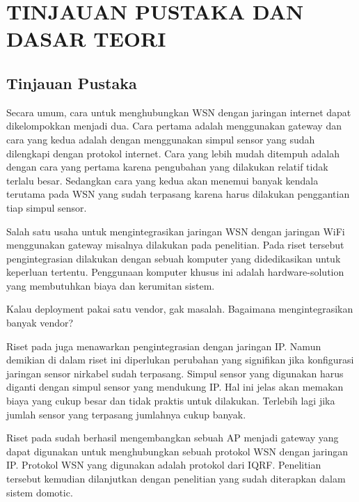 
\chapter{TINJAUAN PUSTAKA DAN DASAR TEORI}                

\section{Tinjauan Pustaka}
  Secara umum, cara untuk menghubungkan WSN dengan jaringan internet dapat dikelompokkan menjadi dua. Cara pertama adalah menggunakan gateway dan cara yang kedua adalah dengan menggunakan simpul sensor yang sudah dilengkapi dengan protokol internet. Cara yang lebih mudah ditempuh adalah dengan cara yang pertama karena pengubahan yang dilakukan relatif tidak terlalu besar. Sedangkan cara yang kedua akan menemui banyak kendala terutama pada WSN yang sudah terpasang karena harus dilakukan penggantian tiap simpul sensor.

  Salah satu usaha untuk mengintegrasikan jaringan WSN dengan jaringan WiFi menggunakan gateway misalnya dilakukan pada penelitian. Pada riset tersebut pengintegrasian dilakukan dengan sebuah komputer yang didedikasikan untuk keperluan tertentu. Penggunaan komputer khusus ini adalah hardware-solution yang membutuhkan biaya dan kerumitan sistem.

  Kalau deployment pakai satu vendor, gak masalah. Bagaimana mengintegrasikan banyak vendor?

  Riset pada juga menawarkan pengintegrasian dengan jaringan IP. Namun demikian di dalam riset ini diperlukan perubahan yang signifikan jika konfigurasi jaringan sensor nirkabel sudah terpasang. Simpul sensor yang digunakan harus diganti dengan simpul sensor yang mendukung IP. Hal ini jelas akan memakan biaya yang cukup besar dan tidak praktis untuk dilakukan. Terlebih lagi jika jumlah sensor yang terpasang jumlahnya cukup banyak.

  Riset pada sudah berhasil mengembangkan sebuah AP menjadi gateway yang dapat digunakan untuk menghubungkan sebuah protokol WSN dengan jaringan IP. Protokol WSN yang digunakan adalah protokol dari IQRF. Penelitian tersebut kemudian dilanjutkan dengan penelitian yang sudah diterapkan dalam sistem domotic.

